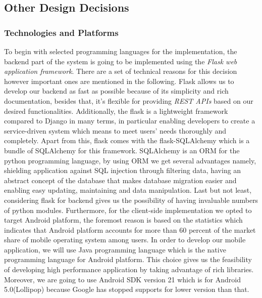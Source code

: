 \subsection{Other Design Decisions}
\subsubsection{Technologies and Platforms}
To begin with selected programming languages for the implementation, the backend part of the system is going to be implemented using the  \emph{Flask web application framework}. There are a set of technical reasons for this decision however important ones are mentioned in the following. Flask allows us to develop our backend as fast as possible because of its simplicity and rich documentation, besides that, it’s flexible for providing  \emph{REST APIs} based on our desired functionalities. Additionally, the flask is a lightweight framework compared to Django in many terms, in particular enabling developers to create a service-driven system which means to meet users’ needs thoroughly and completely. Apart from this, flask comes with the flask-SQLAlchemy which is a bundle of SQLAlchemy for this framework. SQLAlchemy is an ORM for the python programming language, by using ORM we get several advantages namely, shielding application against SQL injection through filtering data, having an abstract concept of the database that makes database migration easier and enabling easy updating, maintaining and data manipulation. Last but not least, considering flask for backend gives us the possibility of having invaluable numbers of python modules.
Furthermore, for the client-side implementation we opted to target Android platform, the foremost reason is based on the statistics which indicates that Android platform accounts for more than 60 percent of the market share of mobile operating system among users. In order to develop our mobile application, we will use Java programming language which is the native programming language for Android platform. This choice gives us the feasibility of developing high performance application by taking advantage of rich libraries. Moreover, we are going to use Android SDK version 21 which is for Android 5.0(Lollipop) because Google has stopped supports for lower version than that.